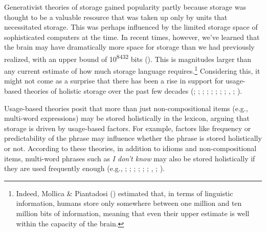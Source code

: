 \documentclass[
  12pt,
  letterpaper,
]{scrreport}
\begin{document}
Generativist theories of storage gained popularity partly because
storage was thought to be a valuable resource that was taken up only by
units that necessitated storage. This was perhaps influenced by the
limited storage space of sophisticated computers at the time. In recent
times, however, we've learned that the brain may have dramatically more
space for storage than we had previously realized, with an upper bound
of 10\textsuperscript{8432} bits
().
This is magnitudes larger than any current estimate of how much storage
language requires.\footnote{Indeed, Mollica \& Piantadosi
  () estimated that,
  in terms of linguistic information, humans store only somewhere
  between one million and ten million bits of information, meaning that
  even their upper estimate is well within the capacity of the brain.}
Considering this, it might not come as a surprise that there has been a
rise in support for usage-based theories of holistic storage over the
past few decades
(;
;
; ; ; ;
; ;
, ;
).

Usage-based theories posit that more than just non-compositional items
(e.g., multi-word expressions) may be stored holistically in the
lexicon, arguing that storage is driven by usage-based factors. For
example, factors like frequency or predictability of the phrase may
influence whether the phrase is stored holistically or not. According to
these theories, in addition to idioms and non-compositional items,
multi-word phrases such as \emph{I don't know} may also be stored
holistically if they are used frequently enough (e.g.,
;
;
;
;
;
;
, ;
).
\end{document}
